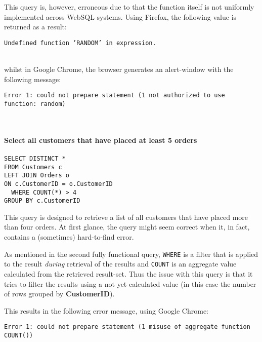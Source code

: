 This query is, however, erroneous due to that the function itself is not
uniformly implemented across WebSQL systems. Using Firefox, the following
value is returned as a result: \\
\begin{centering}
\texttt{Undefined function 'RANDOM' in expression.}
\end{centering}\\
whilst in Google Chrome, the browser generates an alert-window with the
following message:\\
\begin{centering}
\texttt{Error 1: could not prepare statement (1 not authorized to use function: random)}
\end{centering}\\

\paragraph{Select all customers that have placed at least 5 orders}

\begin{lstlisting}[label={sqlstatement4}]
SELECT DISTINCT *
FROM Customers c
LEFT JOIN Orders o
ON c.CustomerID = o.CustomerID
  WHERE COUNT(*) > 4
GROUP BY c.CustomerID
\end{lstlisting}

This query is designed to retrieve a list of all customers
that have placed more than four orders. At first glance, the
query might seem correct when it, in fact, contains a (sometimes)
hard-to-find error.

As mentioned in the second fully functional query, \texttt{WHERE}
is a filter that is applied to the result \textit{during} retrieval
of the results and \texttt{COUNT} is an aggregate value calculated
from the retrieved result-set. Thus the issue with this query is
that it tries to filter the results using a not yet calculated
value (in this case the number of rows grouped by \textbf{CustomerID}).

This results in the following error message, using Google Chrome:\\
\begin{centering}
\texttt{Error 1: could not prepare statement (1 misuse of aggregate function COUNT())}
\end{centering}

